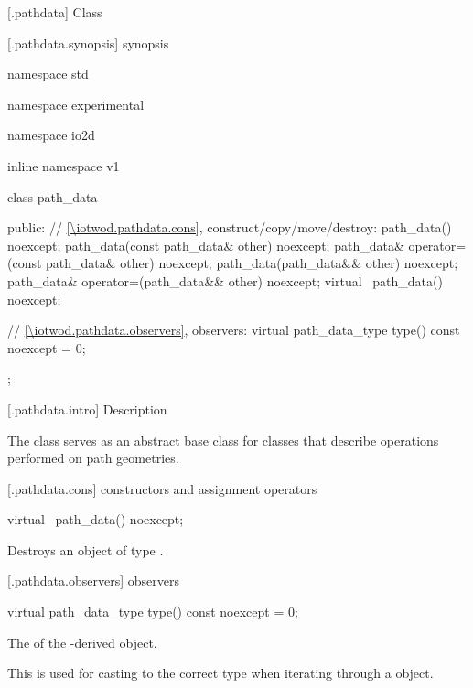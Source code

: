  [\iotwod.pathdata] {Class }

 [\iotwod.pathdata.synopsis] { synopsis}

\begin{codeblock}
namespace std { namespace experimental { namespace io2d { inline namespace v1 {
  class path_data {
  public:
    // \ref{\iotwod.pathdata.cons}, construct/copy/move/destroy:
    path_data() noexcept;
    path_data(const path_data& other) noexcept;
    path_data& operator=(const path_data& other) noexcept;
    path_data(path_data&& other) noexcept;
    path_data& operator=(path_data&& other) noexcept;
    virtual ~path_data() noexcept;

    // \ref{\iotwod.pathdata.observers}, observers:
    virtual path_data_type type() const noexcept = 0;
  };
} } } }
\end{codeblock}

 [\iotwod.pathdata.intro] { Description}

\pnum
{}
The class  serves as an abstract base class for classes that describe operations performed on path geometries.

 [\iotwod.pathdata.cons] { constructors and assignment operators}

\begin{itemdecl}
    virtual ~path_data() noexcept;
\end{itemdecl}
\begin{itemdescr}
	\pnum
	\effects
	Destroys an object of type .
	
\end{itemdescr}

 [\iotwod.pathdata.observers]{ observers}

\begin{itemdecl}
    virtual path_data_type type() const noexcept = 0;
\end{itemdecl}
\begin{itemdescr}
	\pnum
	\returns
	The  of the -derived object.
	
	\pnum
	\realnote
	This is used for casting to the correct type when iterating through a  object.
\end{itemdescr}
